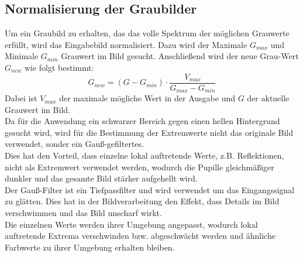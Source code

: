 \subsection{Normalisierung der Graubilder}
Um ein Graubild zu erhalten, das das volle Spektrum der möglichen Grauwerte erfüllt, wird das Eingabebild normalisiert. Dazu wird der Maximale $G_{max}$ und Minimale $G_{min}$ Grauwert im Bild gesucht. Anschließend wird der neue Grau-Wert $G_{new}$ wie folgt bestimmt:
\[G_{new} = (G-G_{min})\cdot \dfrac{V_{max}}{G_{max}-G_{min}}\]
Dabei ist $V_{max}$ der maximale mögliche Wert in der Ausgabe und $G$ der aktuelle Grauwert im Bild.\\
Da für die Anwendung ein schwarzer Bereich gegen einen hellen Hintergrund gesucht wird, wird für die Bestimmung der Extremwerte nicht das originale Bild verwendet, sonder ein Gauß-gefiltertes.\\
Dies hat den Vorteil, dass einzelne lokal auftretende Werte, z.B. Reflektionen, nicht als Extremwert verwendet werden, wodurch die Pupille gleichmäßiger dunkler und das gesamte Bild stärker aufgehellt wird.\\
Der Gauß-Filter ist ein Tiefpassfilter und wird verwendet um das Eingangssignal zu glätten. Dies hat in der Bildverarbeitung den Effekt, dass Details im Bild verschwimmen und das Bild unscharf wirkt.\\
Die einzelnen Werte werden ihrer Umgebung angepasst, wodurch lokal auftretende Extrema verschwinden bzw. abgeschwächt werden und ähnliche Farbwerte zu ihrer Umgebung erhalten bleiben.